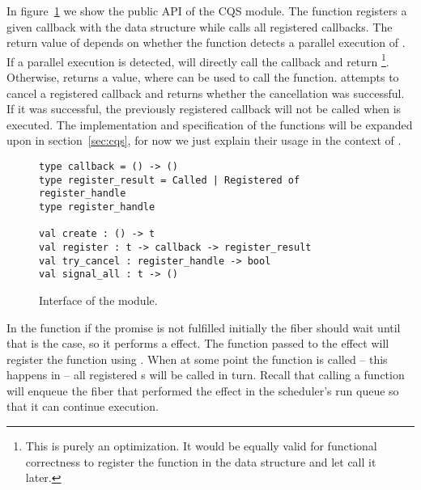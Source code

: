 In figure~\ref{fig:sched-impl-cqs} we show the public API of the CQS module.
The  function registers a given callback with the data structure while  calls all registered callbacks.
The return value of  depends on whether the function detects a parallel execution of .
If a parallel execution is detected,  will directly call the callback and return \footnote{This is purely an optimization. It would be equally valid for functional correctness to register the  function in the data structure and let  call it later.}.
Otherwise,  returns a  value, where  can be used to call the  function.
 attempts to cancel a registered callback and returns whether the cancellation was successful.
If it was successful, the previously registered callback will not be called when  is executed.
The implementation and specification of the functions will be expanded upon in section~\ref{sec:cqs}, for now we just explain their usage in the context of .

\begin{figure}[ht]
  \begin{verbatim}
type callback = () -> ()
type register_result = Called | Registered of register_handle
type register_handle

val create : () -> t
val register : t -> callback -> register_result
val try_cancel : register_handle -> bool
val signal_all : t -> ()
  \end{verbatim}
  \caption{Interface of the  module.}
  \label{fig:sched-impl-cqs}
\end{figure}

In the  function if the promise is not fulfilled initially the fiber should wait until that is the case, so it performs a \esuspend{} effect.
The  function passed to the effect will register the  function using .
When at some point the  function is called -- this happens in  -- all registered s will be called in turn.
Recall that calling a  function will enqueue the fiber that performed the \esuspend{} effect in the scheduler's run queue so that it can continue execution.

